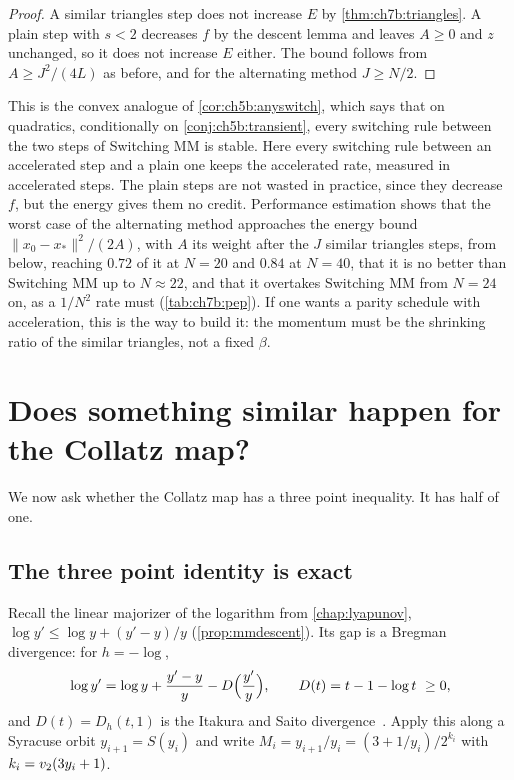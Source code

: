 \begin{proof}
A similar triangles step does not increase $E$ by \cref{thm:ch7b:triangles}.
A plain step with $s<2$ decreases $f$ by the descent lemma and leaves $A\ge0$
and $z$ unchanged, so it does not increase $E$ either. The bound follows from
$A\ge J^2/(4L)$ as before, and for the alternating method $J\ge N/2$.
\end{proof}

This is the convex analogue of \cref{cor:ch5b:anyswitch}, which says that on
quadratics, conditionally on \cref{conj:ch5b:transient}, every switching rule between the two steps of Switching MM is
stable. Here every switching rule between an accelerated step and a plain
one keeps the accelerated rate, measured in accelerated steps. The plain
steps are not wasted in practice, since they decrease $f$, but the energy
gives them no credit. Performance estimation shows that the worst case of the
alternating method approaches the energy bound $\|x_0-x_*\|^2/(2A)$, with $A$ its weight after the $J$ similar triangles steps, from below, reaching $0.72$ of it at
$N=20$ and $0.84$ at $N=40$, that it is no better than Switching MM up to
$N\approx22$, and that it overtakes Switching MM from $N=24$ on, as a $1/N^2$
rate must (\cref{tab:ch7b:pep}). If one wants a parity schedule with acceleration, this
is the way to build it: the momentum must be the shrinking ratio of the similar
triangles, not a fixed $\beta$.

\section{Does something similar happen for the Collatz map?}\label{sec:ch7b:collatz}

We now ask whether the Collatz map has a three point inequality. It has half
of one.

\subsection{The three point identity is exact}

Recall the linear majorizer of the logarithm from \cref{chap:lyapunov},
$\log y'\le\log y+(y'-y)/y$ (\cref{prop:mmdescent}). Its gap is a Bregman
divergence: for $h=-\log$,
\[
  \log y'=\log y+\frac{y'-y}y-D\Bigl(\frac{y'}y\Bigr),\qquad D(t)=t-1-\log t\ \ge0,
\]
and $D(t)=D_h(t,1)$ is the Itakura and Saito divergence~\cite{banerjee2005}.
Apply this along a Syracuse orbit $y_{i+1}=S(y_i)$ and write
$M_i=y_{i+1}/y_i=(3+1/y_i)/2^{k_i}$ with $k_i=v_2(3y_i+1)$.

